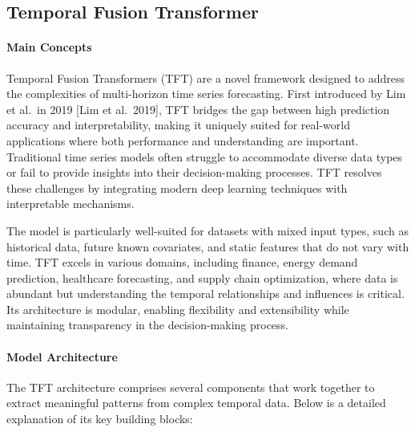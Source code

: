 \documentclass[a4paper]{article}
\begin{document}
    \subsection{Temporal Fusion
Transformer}\label{temporal-fusion-transformer}

    \paragraph{Main Concepts}\label{main-concepts}

Temporal Fusion Transformers (TFT) are a novel framework designed to
address the complexities of multi-horizon time series forecasting. First
introduced by Lim et al.~in 2019 {[}Lim et al.~2019{]}, TFT bridges the
gap between high prediction accuracy and interpretability, making it
uniquely suited for real-world applications where both performance and
understanding are important. Traditional time series models often
struggle to accommodate diverse data types or fail to provide insights
into their decision-making processes. TFT resolves these challenges by
integrating modern deep learning techniques with interpretable
mechanisms.

The model is particularly well-suited for datasets with mixed input
types, such as historical data, future known covariates, and static
features that do not vary with time. TFT excels in various domains,
including finance, energy demand prediction, healthcare forecasting, and
supply chain optimization, where data is abundant but understanding the
temporal relationships and influences is critical. Its architecture is
modular, enabling flexibility and extensibility while maintaining
transparency in the decision-making process.

\paragraph{Model Architecture}\label{model-architecture}

The TFT architecture comprises several components that work together to
extract meaningful patterns from complex temporal data. Below is a
detailed explanation of its key building blocks:
\end{document}
